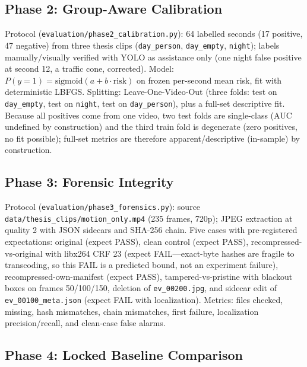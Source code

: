 \subsection{Phase 2: Group-Aware Calibration}

Protocol (\texttt{evaluation/phase2\_calibration.py}): 64 labelled seconds (17 positive, 47 negative) from three thesis clips (\texttt{day\_person}, \texttt{day\_empty}, \texttt{night}); labels manually/visually verified with YOLO as assistance only (one night false positive at second 12, a traffic cone, corrected). Model: $P(y{=}1)=\mathrm{sigmoid}(a+b\cdot\mathrm{risk})$ on frozen per-second mean risk, fit with deterministic LBFGS. Splitting: Leave-One-Video-Out (three folds: test on \texttt{day\_empty}, test on \texttt{night}, test on \texttt{day\_person}), plus a full-set descriptive fit. Because all positives come from one video, two test folds are single-class (AUC undefined by construction) and the third train fold is degenerate (zero positives, no fit possible); full-set metrics are therefore apparent/descriptive (in-sample) by construction.

\subsection{Phase 3: Forensic Integrity}

Protocol (\texttt{evaluation/phase3\_forensics.py}): source \texttt{data/thesis\_clips/motion\_only.mp4} (235 frames, 720p); JPEG extraction at quality 2 with JSON sidecars and SHA-256 chain. Five cases with pre-registered expectations: original (expect PASS), clean control (expect PASS), recompressed-vs-original with libx264 CRF 23 (expect FAIL---exact-byte hashes are fragile to transcoding, so this FAIL is a predicted bound, not an experiment failure), recompressed-own-manifest (expect PASS), tampered-vs-pristine with blackout boxes on frames 50/100/150, deletion of \texttt{ev\_00200.jpg}, and sidecar edit of \texttt{ev\_00100\_meta.json} (expect FAIL with localization). Metrics: files checked, missing, hash mismatches, chain mismatches, first failure, localization precision/recall, and clean-case false alarms.

\subsection{Phase 4: Locked Baseline Comparison}

